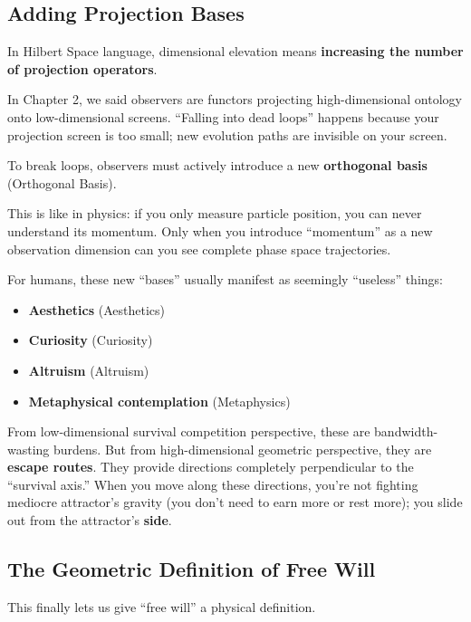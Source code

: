 \subsection{Adding Projection Bases}

In Hilbert Space language, dimensional elevation means \textbf{increasing the number of projection operators}.

In Chapter 2, we said observers are functors projecting high-dimensional ontology onto low-dimensional screens. ``Falling into dead loops'' happens because your projection screen is too small; new evolution paths are invisible on your screen.

To break loops, observers must actively introduce a new \textbf{orthogonal basis} (Orthogonal Basis).

This is like in physics: if you only measure particle position, you can never understand its momentum. Only when you introduce ``momentum'' as a new observation dimension can you see complete phase space trajectories.

For humans, these new ``bases'' usually manifest as seemingly ``useless'' things:

\begin{itemize}
\item \textbf{Aesthetics} (Aesthetics)

\item \textbf{Curiosity} (Curiosity)

\item \textbf{Altruism} (Altruism)

\item \textbf{Metaphysical contemplation} (Metaphysics)
\end{itemize}

From low-dimensional survival competition perspective, these are bandwidth-wasting burdens. But from high-dimensional geometric perspective, they are \textbf{escape routes}. They provide directions completely perpendicular to the ``survival axis.'' When you move along these directions, you're not fighting mediocre attractor's gravity (you don't need to earn more or rest more); you slide out from the attractor's \textbf{side}.

\subsection{The Geometric Definition of Free Will}

This finally lets us give ``free will'' a physical definition.


